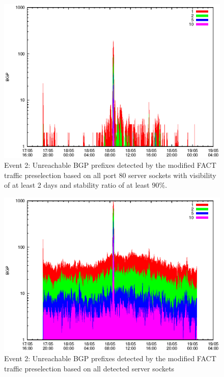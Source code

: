 \begin{figure}
	[p] \centering 
	\includegraphics[width=0.75\linewidth]{images/events/2010_05_18/bgp_log_port80_Set_stab_9_vts_2.eps} \caption{Event 2: Unreachable BGP prefixes detected by the modified FACT traffic preselection based on all port 80 server sockets with visibility of at least 2 days and stability ratio of at least $90\%$.} 
	\label{fig:TIER1_FACT_allSES80VTS2STAB9} 
\end{figure}
\begin{figure}
	[p] \centering 
	\includegraphics[width=0.75\linewidth]{images/events/2010_05_18/bgp_log_all_external.eps} \caption{Event 2: Unreachable BGP prefixes detected by the modified FACT traffic preselection based on all detected server sockets} 
	\label{fig:TIER1_FACT_allSES} 
\end{figure}
